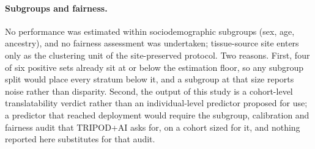 \paragraph{Subgroups and fairness.}
No performance was estimated within sociodemographic subgroups (sex,
age, ancestry), and no fairness assessment was undertaken; tissue-source
site enters only as the clustering unit of the site-preserved protocol.
Two reasons. First, four of six positive sets already sit at or below
the estimation floor, so any subgroup split would place every stratum
below it, and a subgroup \auroc{} at that size reports noise rather than
disparity. Second, the output of this study is a cohort-level
translatability verdict rather than an individual-level predictor
proposed for use; a predictor that reached deployment would require the
subgroup, calibration and fairness audit that TRIPOD+AI asks
for,\cite{collins2024tripodai} on a cohort sized for it, and nothing
reported here substitutes for that audit.
